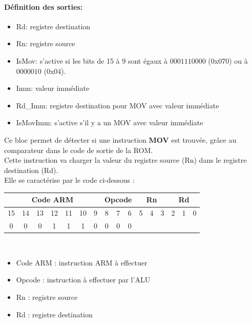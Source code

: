 \documentclass[a4paper]{article} %
\begin{document}
\paragraph{Définition des sorties:}
\begin{itemize}
    \item     Rd: registre destination
    \item     Rn: registre source
    \item     IsMov: s'active si les bits de 15 à 9 sont égaux à $0001110000$ (0x070) ou à $0000010$ (0x04).
    \item     Imm: valeur immédiate
    \item     Rd\_Imm: registre destination pour MOV avec valeur immédiate
    \item     IsMovImm: s'active s'il y a un MOV avec valeur immédiate

\end{itemize}

\medskip

Ce bloc permet de détecter si une instruction \textbf{MOV} est trouvée, grâce au comparateur dans le code de sortie de la ROM.
\\Cette instruction va charger la valeur du registre source (Rn) dans le registre destination (Rd).\\
Elle se caractérise par le code ci-dessous : 
\\
\begin{tabular}{|ccccccc|ccc|ccc|ccc|}
    \hline
    \multicolumn{7}{|c|}{Code ARM}  & \multicolumn{3}{|c|}{Opcode} & \multicolumn{3}{|c|}{Rn} & \multicolumn{3}{|c|}{Rd}\\
    \hline
    15 & 14 & 13 & 12 & 11 & 10 & 9 & 8 & 7 & 6                    & 5 & 4 & 3                & 2 & 1 & 0 \\
    \hline
    0  & 0  & 0  & 1  & 1  & 1  & 0 & 0 & 0 & 0                    & \multicolumn{3}{|c|}{}   &\multicolumn{3}{|c|}{}\\
    \hline     
    \end{tabular}
\\

\begin{itemize}
    \item     Code ARM : instruction ARM à effectuer
    \item     Opcode : instruction à effectuer par l'ALU
    \item     Rn : registre source
    \item     Rd : registre destination
\end{itemize}
\end{document}
